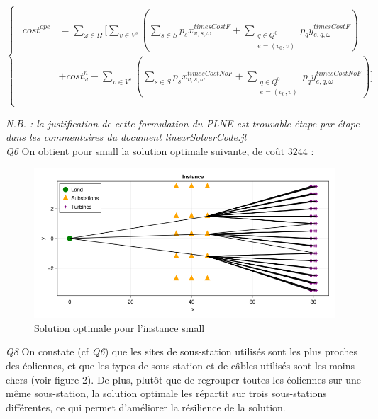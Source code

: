 \documentclass[a4paper,12pt]{article}
\begin{document}
    \begin{equation}
        \begin{cases}
            \begin{alignedat}{2}
                 cost^{ope} &= \sum_{\omega \in \Omega} \lbrack \sum_{v \in V^s} ( \sum_{s \in S} p_s x_{v,s,\omega}^{timesCostF} + \sum_{\substack{q \in Q^0 \\ e = (v_0, v)}} p_q y_{e,q,\omega}^{timesCostF} ) \\
                &+ cost^n_{\omega} - \sum_{v \in V^s} ( \sum_{s \in S} p_s x_{v,s,\omega}^{timesCostNoF} + \sum_{\substack{q \in Q^0 \\ e = (v_0, v)}} p_q y_{e,q,\omega}^{timesCostNoF} ) \rbrack \\ 
                 
            \end{alignedat}
        \end{cases}
    \end{equation}

    \textit{N.B. : la justification de cette formulation du PLNE est trouvable étape par étape dans les commentaires du document linearSolverCode.jl} \\
\textit{Q6}
On obtient pour small la solution optimale suivante, de coût $3244$ :

\begin{figure}[h]
    \centering
    \includegraphics[scale=0.3]{small.png}
    \caption{Solution optimale pour l'instance small}
\end{figure}

\textit{Q8}
On constate (cf \textit{Q6}) que les sites de sous-station utilisés sont les plus proches des éoliennes, et que les types de sous-station et de câbles utilisés sont les moins chers (voir figure 2).
De plus, plutôt que de regrouper toutes les éoliennes sur une même sous-station, la solution optimale les répartit sur trois sous-stations différentes, ce qui permet d'améliorer la résilience de la solution.
\end{document}
